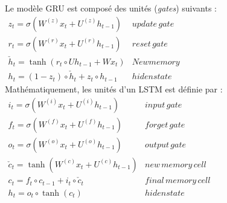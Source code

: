 Le modèle GRU est composé des unités (\textit{gates}) suivants :\\
$\begin{matrix}
z_{t}=\sigma(W^{(z)}x_{t}+ U^{(z)}h_{t-1}) & update\, gate\\ 
r_{t}=\sigma(W^{(r)}x_{t}+ U^{(r)}h_{t-1}) & reset\, gate\\ 
\check{h}_{t} = \tanh(r_{t} \circ Uh_{t-1}+Wx_{t}) & New memory\\ 
h_{t}=(1-z_{t}) \circ \check{h}_{t} + z_{t} \circ h_{t-1}& hiden state 
\end{matrix}
$
\\


 Mathématiquement, les unités d'un LSTM est définie par :\\

$\begin{matrix}
i_{t}=\sigma(W^{(i)}x_{t}+ U^{(i)}h_{t-1}) & input\, gate\\ 
f_{t}=\sigma(W^{(f)}x_{t}+ U^{(f)}h_{t-1}) & forget\, gate\\
o_{t}=\sigma(W^{(o)}x_{t}+ U^{(o)}h_{t-1}) & output\, gate\\ 
\check{c}_{t} = \tanh(W^{(c)}x_{t}+ U^{(c)}h_{t-1}) & new\, memory\, cell\\
c_{t}=f_{t} \circ c_{t-1}+i_{t} \circ \check{c}_{t} & final\, memory\, cell\\
h_{t}=o_{t} \circ \tanh(c_{t})& hiden state 
\end{matrix}$

